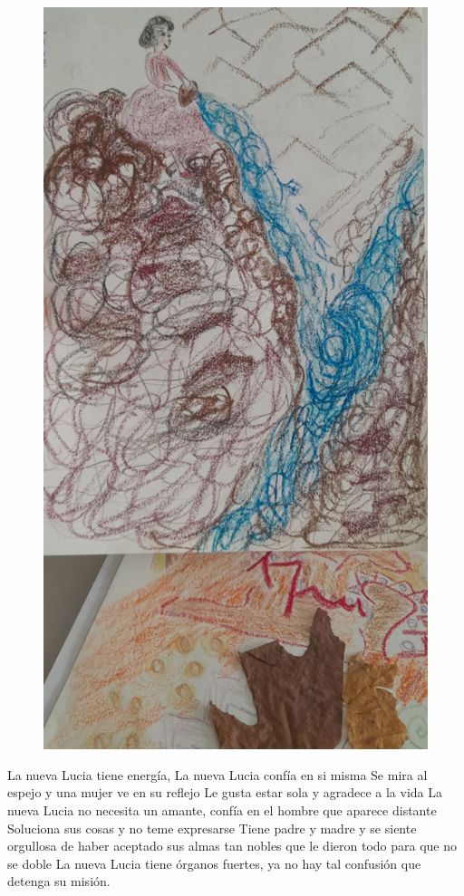 \documentclass[12pt, a4paper, twoside]{book} %
\begin{document}
\begin{figure}[H]
	\centering
	\includegraphics[width=\textwidth]{./images/1f81324df13197.jpg}
\end{figure}

La nueva Lucia tiene energía,
La nueva Lucia confía en si misma
Se mira al espejo y una mujer ve en su reflejo
Le gusta estar sola y agradece a la vida
La nueva Lucia no necesita un amante, confía en el hombre que aparece distante
Soluciona sus cosas y no teme expresarse
Tiene padre y madre y se siente orgullosa de haber aceptado sus almas tan nobles que le dieron todo para que no se doble
La nueva Lucia tiene órganos fuertes, ya no hay tal confusión que detenga su misión.
\end{document}
